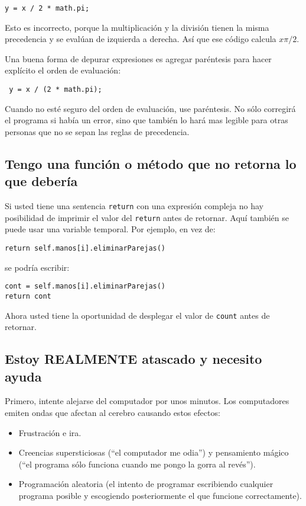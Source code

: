 \beforeverb
\begin{verbatim}
y = x / 2 * math.pi;
\end{verbatim}
\afterverb
%
Esto es incorrecto, porque la multiplicación y la división 
tienen la misma precedencia y se evalúan de izquierda
a derecha. Así que ese código calcula $x \pi / 2$.

Una buena forma de depurar expresiones es agregar paréntesis
para hacer explícito el orden de evaluación:


\beforeverb
\begin{verbatim}
 y = x / (2 * math.pi);
\end{verbatim}
\afterverb
%
Cuando no esté seguro del orden de evaluación, use paréntesis.
No sólo corregirá el programa si había un error, sino que también
lo hará mas legible para otras personas que no se sepan las
reglas de precedencia.


\subsection{Tengo una función o método que no retorna lo que debería}

Si usted tiene una sentencia \texttt{return} con una expresión 
compleja no hay posibilidad de imprimir el valor del \texttt{return} 
antes de retornar. Aquí también se puede usar una variable temporal.
Por ejemplo, en vez de:


\beforeverb
\begin{verbatim}
return self.manos[i].eliminarParejas()
\end{verbatim}
\afterverb
%
se podría escribir:

\beforeverb
\begin{verbatim}
cont = self.manos[i].eliminarParejas()
return cont
\end{verbatim}
\afterverb
%
Ahora usted tiene la oportunidad de desplegar el valor
de \texttt{count} antes de retornar.


\subsection{Estoy REALMENTE atascado y necesito ayuda}

Primero, intente alejarse del computador por unos minutos.
Los computadores emiten ondas que afectan al cerebro 
causando estos efectos:


\begin{itemize}

\item Frustración e ira.

\item Creencias supersticiosas (``el computador me odia'') y 
pensamiento mágico (``el programa sólo funciona cuando me
pongo la gorra al revés'').

\item Programación aleatoria (el intento de programar 
escribiendo cualquier programa posible y escogiendo posteriormente
el que funcione correctamente).

\end{itemize}

